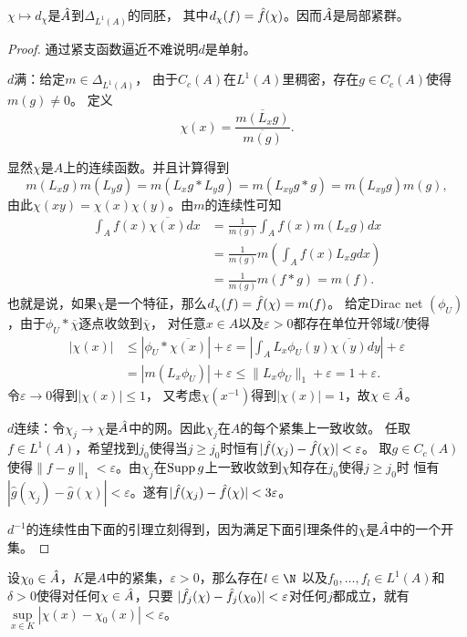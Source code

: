 \begin{theorem}
    $\chi \mapsto d_\chi$是$\hat{A}$到$\Delta_{L^1(A)}$的同胚，
    其中$d_\chi(f) = \hat{f}(\chi)$。因而$\hat{A}$是局部紧群。
\end{theorem}
\begin{proof}
通过紧支函数逼近不难说明$d$是单射。

$d$满：给定$m \in \Delta_{L^1(A)}$，
由于$C_c(A)$在$L^1(A)$里稠密，存在$g \in C_c(A)$使得$m(g)\neq 0$。
定义\[\chi(x) = \frac{\overline{m(L_xg)}}{\overline{m(g)}}.\]

显然$\chi$是$A$上的连续函数。并且计算得到\[m(L_xg)m(L_yg) = m(L_xg*L_yg) = m(L_{xy}g*g) = m(L_{xy}g)m(g),\]
由此$\chi(xy) = \chi(x)\chi(y)$。由$m$的连续性可知
\begin{align*}
    \int_A f(x)\overline{\chi(x)} dx & = \frac{1}{m(g)}\int_A f(x)m(L_xg) dx \\
    & = \frac{1}{m(g)}m\left( \int_A f(x)L_xg dx \right) \\ 
    & = \frac{1}{m(g)} m(f*g) = m(f).
\end{align*}
也就是说，如果$\chi$是一个特征，那么$d_\chi(f) = \hat{f}(\chi) = m(f)$。
给定Dirac net $(\phi_U)$，由于$\phi_U*\overline{\chi}$逐点收敛到$\overline{\chi}$，
对任意$x \in A$以及$\varepsilon > 0$都存在单位开邻域$U$使得
\begin{align*}
    |\chi(x)| & \leqslant |\phi_U*\overline{\chi(x)}|+\varepsilon 
    = \left| \int_AL_x\phi_U(y)\overline{\chi(y)} dy\right|+\varepsilon
    \\ & = \left| m(L_x\phi_U) \right|+\varepsilon \leqslant \|L_x\phi_U\|_1+\varepsilon = 1+\varepsilon.
\end{align*}
令$\varepsilon \to 0$得到$|\chi(x)| \leqslant 1$，
又考虑$\chi(x^{-1})$得到$|\chi(x)| = 1$，故$\chi \in \hat{A}$。

$d$连续：令$\chi_j \to \chi$是$\hat{A}$中的网。因此$\chi_j$在$A$的每个紧集上一致收敛。
任取$f \in L^1(A)$，希望找到$j_0$使得当$j \geqslant j_0$时恒有$|\hat{f}(\chi_j) - \hat{f}(\chi)|<\varepsilon$。
取$g \in C_c(A)$使得$\|f - g\|_1 < \varepsilon$。由$\chi_j$在$\operatorname{Supp} g$上一致收敛到$\chi$知存在$j_0$使得$j \geqslant j_0$时
恒有$|\hat{g}(\chi_j) - \hat{g}(\chi)|<\varepsilon$。遂有$|\hat{f}(\chi_j) - \hat{f}(\chi)|<3\varepsilon$。

$d^{-1}$的连续性由下面的引理立刻得到，因为满足下面引理条件的$\chi$是$\hat{A}$中的一个开集。
\end{proof}
\begin{lemma}
    设$\chi_0 \in \hat{A}$，$K$是$A$中的紧集，$\varepsilon > 0$，那么存在$l \in \N$
    以及$f_0,\ldots,f_l \in L^1(A)$和$\delta>0$使得对任何$\chi \in \hat{A}$，只要
    $|\hat{f}_j(\chi) - \hat{f}_j(\chi_0)| < \varepsilon$对任何$j$都成立，就有$\sup\limits_{x \in K} |\chi(x) - \chi_0(x)|<\varepsilon$。
\end{lemma}
